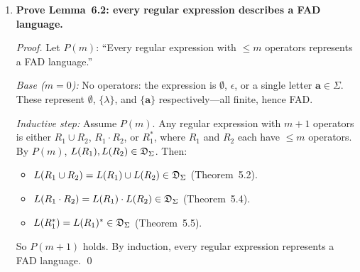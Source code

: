 \begin{enumerate}[{6.}1.]
\begin{enumerate}[(a)]
  \item \textbf{Eliminate $X_3$, then $X_2$:}

  Since $X_3=X_1$, eliminate $X_3$.  From $X_2=\epsilon\cup\pmb{0}X_1\cup\pmb{1}X_2$: by Theorem~6.1 ($\lambda\notin\{\pmb{1}\}$): $X_2=\pmb{1}^*(\epsilon\cup\pmb{0}X_1)=\pmb{1}^*\cup\pmb{1}^*\pmb{0}X_1$.
  Substitute into $X_1=(\pmb{0}\cup\pmb{1})X_2=(\pmb{0}\cup\pmb{1})(\pmb{1}^*\cup\pmb{1}^*\pmb{0}X_1)=(\pmb{0}\cup\pmb{1})\pmb{1}^*\cup(\pmb{0}\cup\pmb{1})\pmb{1}^*\pmb{0}X_1$.
  By Theorem~6.1: $X_1=((\pmb{0}\cup\pmb{1})\pmb{1}^*\pmb{0})^*(\pmb{0}\cup\pmb{1})\pmb{1}^*$.
  Then
  \[
    X_2=\pmb{1}^*\cup\pmb{1}^*\pmb{0}((\pmb{0}\cup\pmb{1})\pmb{1}^*\pmb{0})^*(\pmb{0}\cup\pmb{1})\pmb{1}^*,
    \qquad
    X_3=X_1.
  \]

  \item \textbf{Eliminate $X_3$, then $X_1$:}

  Same $X_3=X_1$.  From $X_1=(\pmb{0}\cup\pmb{1})X_2$, substitute into $X_2$:
  $X_2=\epsilon\cup\pmb{0}(\pmb{0}\cup\pmb{1})X_2\cup\pmb{1}X_2=\epsilon\cup(\pmb{0}(\pmb{0}\cup\pmb{1})\cup\pmb{1})X_2$.
  Let $A=\pmb{0}(\pmb{0}\cup\pmb{1})\cup\pmb{1}=\pmb{00}\cup\pmb{01}\cup\pmb{1}$; $\lambda\notin A$.
  $X_2=A^*$.
  Then $X_1=(\pmb{0}\cup\pmb{1})A^*$ and $X_3=X_1$.

  \item \textbf{Comparison:} Both solutions are equivalent: $(\pmb{0}\cup\pmb{1})\pmb{1}^*(\pmb{0}(\pmb{0}\cup\pmb{1})\pmb{1}^*)^*=(\pmb{0}\cup\pmb{1})(\pmb{00}\cup\pmb{01}\cup\pmb{1})^*$.  The second form is more concise.
\end{enumerate}

\item \textbf{Prove Lemma~6.2: every regular expression describes a FAD language.}

\begin{proof}
Let $P(m)$: ``Every regular expression with $\le m$ operators represents a FAD language.''

\emph{Base ($m=0$):}  No operators: the expression is $\emptyset$, $\epsilon$, or a single letter $\pmb{a}\in\Sigma$.  These represent $\emptyset$, $\{\lambda\}$, and $\{\pmb{a}\}$ respectively---all finite, hence FAD.

\emph{Inductive step:}  Assume $P(m)$.  Any regular expression with $m+1$ operators is either $R_1\cup R_2$, $R_1\cdot R_2$, or $R_1^*$, where $R_1$ and $R_2$ each have $\le m$ operators.  By $P(m)$, $L(R_1),L(R_2)\in\mathfrak{D}_\Sigma$.  Then:
\begin{itemize}
  \item $L(R_1\cup R_2)=L(R_1)\cup L(R_2)\in\mathfrak{D}_\Sigma$ (Theorem~5.2).
  \item $L(R_1\cdot R_2)=L(R_1)\cdot L(R_2)\in\mathfrak{D}_\Sigma$ (Theorem~5.4).
  \item $L(R_1^*)=L(R_1)^*\in\mathfrak{D}_\Sigma$ (Theorem~5.5).
\end{itemize}
So $P(m+1)$ holds.  By induction, every regular expression represents a FAD language. \qed
\end{proof}


\end{enumerate}
